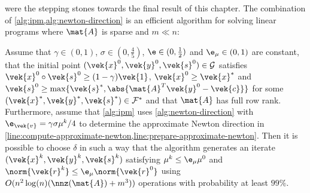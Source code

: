  were the stepping stones towards the final result of this chapter.
The combination of \cref{alg:ipm,alg:newton-direction} is an efficient algorithm for solving linear programs where \(\mat{A}\) is sparse and \(m \ll n\):

\begin{theorem}\label{thm:combined-algorithm-convergence}
  Assume that \(\gamma \in (0, 1)\), \(\sigma \in (0, \frac{4}{5})\), \(\e \in (0, \frac{1}{2})\) and \(\e_\mu \in (0, 1)\) are constant, that the initial point \((\vek{x}^0, \vek{y}^0, \vek{s}^0) \in \mathcal{G}\) satisfies \(\vek{x}^0 \circ \vek{s}^0 \geq (1-\gamma)\vek{1}\), \(\vek{x}^0 \geq \vek{x}^*\) and \(\vek{s}^0 \geq \max \{\vek{s}^*, \abs{\mat{A}^T \vek{y}^0 - \vek{c}}\}\) for some \((\vek{x}^*, \vek{y}^*, \vek{s}^*) \in \mathcal{F}^*\) and that \(\mat{A}\) has full row rank.
  Furthermore, assume that \cref{alg:ipm} uses \cref{alg:newton-direction} with \(\e_{\vek{v}} = \gamma \sigma \mu^k / 4\) to determine the approximate Newton direction in \cref{line:compute-approximate-newton,line:prepare-approximate-newton}.
  Then it is possible to choose \(\delta\) in such a way that the algorithm generates an iterate \((\vek{x}^k, \vek{y}^k, \vek{s}^k)\) satisfying \(\mu^k \leq \e_\mu \mu^0\) and \(\norm{\vek{r}^k} \leq \e_\mu \norm{\vek{r}^0}\) using \(O(n^2 \log(n) (\nnz(\mat{A}) + m^3))\) operations with probability at least \(99\%\).
\end{theorem}
